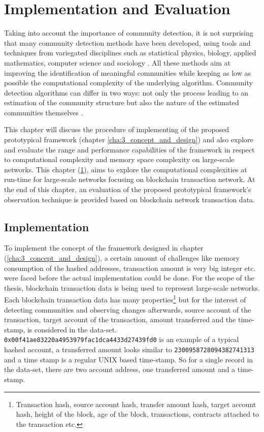 \chapter{Implementation and Evaluation}\label{cha:4_implementation_and_evaluation}
Taking into account the importance of community detection, it is not surprising that many community detection methods have been developed, using tools and techniques from variegated disciplines such as statistical physics, biology, applied mathematics, computer science and sociology \cite{ref-49}. All these methods aim at improving the identification of meaningful communities while keeping as low as possible the computational complexity of the underlying algorithm. Community detection algorithms can differ in two ways: not only the process leading to an estimation of the community structure but also the nature of the estimated communities themselves \cite{ref-50}. 

This chapter will discuss the procedure of implementing of the proposed prototypical framework (chapter \ref{cha:3_concept_and_design}) and also explore and evaluate the range and performance capabilities of the framework in respect to computational complexity and memory space complexity on large-scale networks. This chapter (\ref{cha:4_implementation_and_evaluation}), aims to explore the computational complexities at run-time for large-scale networks focusing on blockchain transaction network. At the end of this chapter, an evaluation of the proposed prototypical framework's observation technique is provided based on blockchain network transaction data.

\section{Implementation}
To implement the concept of the framework designed in chapter (\ref{cha:3_concept_and_design}), a certain amount of challenges like memory consumption of the hashed addresses, transaction amount is very big integer etc. were faced before the actual implementation could be done. For the scope of the thesis, blockchain transaction data is being used to represent large-scale networks. Each blockchain transaction data has many properties\footnote{Transaction hash, source account hash, transfer amount hash, target account hash, height of the block, age of the block, transactions, contracts attached to the transaction etc.} but for the interest of detecting communities and observing changes afterwards, source account of the transaction, target account of the transaction, amount transferred and the time-stamp, is considered in the data-set. \texttt{0x00f41ae83220a4953979fac1dca4433d27439fd0} is an example of a typical hashed account, a transferred amount looks similar to \texttt{2300958728094382741313} and a time stamp is a regular UNIX based time-stamp. So for a single record in the data-set, there are two account address, one transferred amount and a time-stamp.

